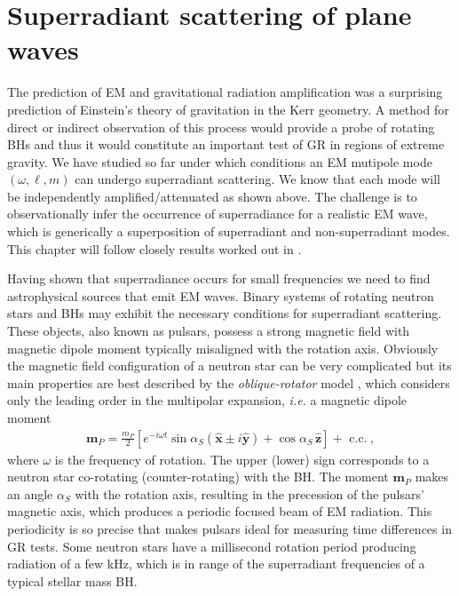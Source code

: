 
\chapter{Superradiant scattering of plane waves} %
\label{Chapter5}

The prediction of EM and gravitational radiation amplification was a surprising prediction of Einstein's theory of gravitation in the Kerr geometry.
A method for direct or indirect observation of this process would provide a probe of rotating BHs and thus it would constitute an important test of GR in regions of extreme gravity.
We have studied so far under which conditions an EM mutipole mode $(\omega,\ell, m)$ can undergo superradiant scattering.
We know that each mode will be independently amplified/attenuated as shown above.
The challenge is to observationally infer the occurrence of superradiance for a realistic EM wave, which is generically a superposition of superradiant and non-superradiant modes. This chapter will follow closely results worked out in \cite{Rosa2017}.

Having shown that superradiance occurs for small frequencies we need to find astrophysical sources that emit EM waves.
Binary systems of rotating neutron stars and BHs may exhibit the necessary conditions for superradiant scattering.
These objects, also known as pulsars, possess a strong magnetic field with magnetic dipole moment typically misaligned with the rotation axis.
Obviously the magnetic field configuration of a neutron star can be very complicated but its main properties are best described by the \emph{oblique-rotator} model \cite{Pacini1968}, which considers only the leading order in the multipolar expansion, \emph{i.e.} a magnetic dipole moment
\begin{align}
    \mathbf{m}_P = \frac{m_P}{2} \left[ e^{-i \omega t} \sin\alpha_S ( \mathbf{\hat{x}} \pm i \mathbf{\hat{y}}) + \cos\alpha_S \,\mathbf{\hat{z}} \right] + \text{ c.c.} ~,
\end{align}
where $\omega$ is the frequency of rotation.
The upper (lower) sign corresponds to a neutron star co-rotating (counter-rotating) with the BH.
The moment $\mathbf{m}_P$ makes an angle $\alpha_S$ with the rotation axis, resulting in the precession of the pulsars' magnetic axis, which produces a periodic focused beam of EM radiation.
This periodicity is so precise that makes pulsars ideal for measuring time differences in GR tests.
Some neutron stars have a millisecond rotation period producing radiation of a few kHz, which is in range of the superradiant frequencies of a typical stellar mass BH.  

